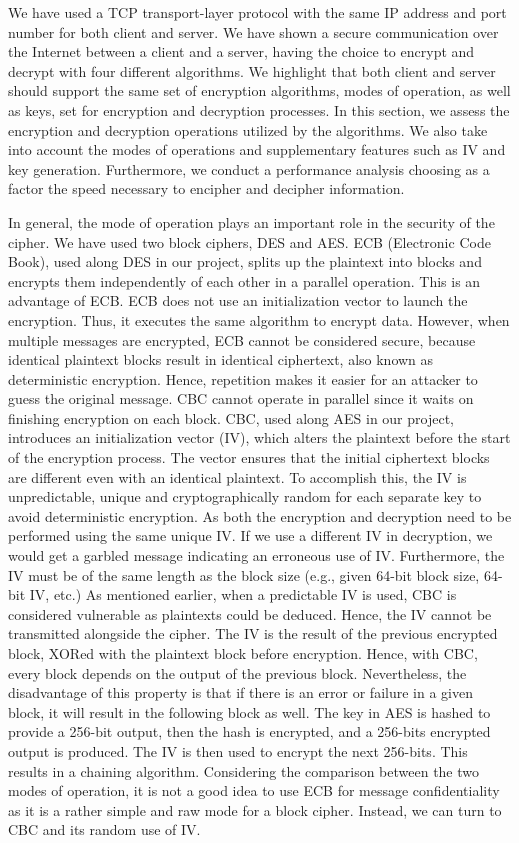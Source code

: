 We have used a TCP transport-layer protocol with the same IP address and port number for both client and server. We have shown a secure communication over the Internet between a client and a server, having the choice to encrypt and decrypt with four different algorithms. We highlight that both client and server should support the same set of encryption algorithms, modes of operation, as well as keys, set for encryption and decryption processes. In this section, we assess the encryption and decryption operations utilized by the algorithms. We also take into account the modes of operations and supplementary features such as IV and key generation. Furthermore, we conduct a performance analysis choosing as a factor the speed necessary to encipher and decipher information. 

In general, the mode of operation plays an important role in the security of the cipher. We have used two block ciphers, DES and AES. ECB (Electronic Code Book), used along DES in our project, splits up the plaintext into blocks and encrypts them independently of each other in a parallel operation. This is an advantage of ECB. ECB does not use an initialization vector to launch the encryption. Thus, it executes the same algorithm to encrypt data. However, when multiple messages are encrypted, ECB cannot be considered secure, because identical plaintext blocks result in identical ciphertext, also known as deterministic encryption. Hence, repetition makes it easier for an attacker to guess the original message. CBC cannot operate in parallel since it waits on finishing encryption on each block. CBC, used along AES in our project, introduces an initialization vector (IV), which alters the plaintext before the start of the encryption process. The vector ensures that the initial ciphertext blocks are different even with an identical plaintext. To accomplish this, the IV is unpredictable, unique and cryptographically random for each separate key to avoid deterministic encryption. As both the encryption and decryption need to be performed using the same unique IV.  If we use a different IV in decryption, we would get a garbled message indicating an erroneous use of IV. Furthermore, the IV must be of the same length as the block size (e.g., given 64-bit block size, 64-bit IV, etc.) As mentioned earlier, when a predictable IV is used, CBC is considered vulnerable as plaintexts could be deduced. Hence, the IV cannot be transmitted alongside the cipher. The IV is the result of the previous encrypted block, XORed with the plaintext block before encryption. Hence, with CBC, every block depends on the output of the previous block. Nevertheless, the disadvantage of this property is that if there is an error or failure in a given block, it will result in the following block as well. The key in AES is hashed to provide a 256-bit output, then the hash is encrypted, and a 256-bits encrypted output is produced. The IV is then used to encrypt the next 256-bits. This results in a chaining algorithm.
Considering the comparison between the two modes of operation, it is not a good idea to use ECB for message confidentiality as it is a rather simple and raw mode for a block cipher. Instead, we can turn to CBC and its random use of IV. 

